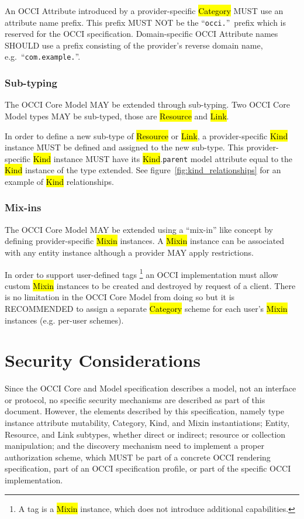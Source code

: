 \documentclass[10pt,a4paper]{article}
\begin{document}
An OCCI Attribute introduced by a provider-specific \hl{Category} MUST use
an attribute name prefix. This prefix MUST NOT be the
``\texttt{occi.}''~prefix which is reserved for the OCCI
specification. Domain-specific OCCI Attribute names SHOULD use a prefix
consisting of the provider's reverse domain name,
e.g.~``\texttt{com.example.}''.

\subsubsection{Sub-typing}
The OCCI Core Model MAY be extended through sub-typing.  Two OCCI
Core Model types MAY be sub-typed, those are \hl{Resource} and \hl{Link}.

In order to define a new sub-type of \hl{Resource} or \hl{Link}, a
provider-specific \hl{Kind} instance MUST be defined and assigned to
the new sub-type.
This provider-specific \hl{Kind} instance MUST have its \hl{Kind}.{\tt parent}
model attribute equal to the \hl{Kind} instance of the type extended.
See figure~\ref{fig:kind_relationships} for an example of \hl{Kind}
relationships.

\subsubsection{Mix-ins}
The OCCI Core Model MAY be extended using a ``mix-in'' like concept by
defining provider-specific \hl{Mixin} instances.  A \hl{Mixin}
instance can be associated with any entity instance although a
provider MAY apply restrictions.

In order to support user-defined tags%
\footnote{A tag is a \hl{Mixin} instance, which does not introduce
  additional capabilities.}
an OCCI implementation must allow custom \hl{Mixin}
instances to be created and destroyed by request of a client.  There
is no limitation in the OCCI Core Model from doing so but it is
RECOMMENDED to assign a separate \hl{Category} scheme for each user's
\hl{Mixin} instances (e.g. per-user schemes).

\section{Security Considerations}
Since the OCCI Core and Model specification describes a model, not an interface
or protocol, no specific security mechanisms are described as part of this
document. However, the elements described by this specification, namely type
instance attribute mutability, Category, Kind, and Mixin instantiations; Entity,
Resource, and Link subtypes,  whether direct or indirect; resource or
collection manipulation; and the discovery mechanism need to implement a proper
authorization scheme, which MUST be part of a concrete OCCI rendering
specification, part of an OCCI specification profile, or part of the specific
OCCI implementation.
\end{document}

